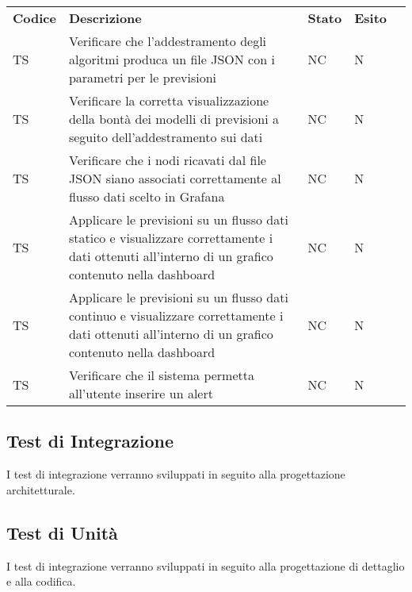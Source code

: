 \begin{longtable} {
		>{\centering}p{15mm} 
		>{\centering}p{79.5mm}
		>{\centering}p{15mm} 
		>{\centering}p{15mm}
		>{}p{0mm}}
	\rowcolor{gray!50}
	\textbf{Codice} & \textbf{Descrizione} & \textbf{Stato} & \textbf{Esito} &\TBstrut \\
	TS & Verificare che l'addestramento degli algoritmi produca un file JSON con i parametri per le previsioni & NC & N  &\TBstrut \\ [2mm]
	TS & Verificare la corretta visualizzazione della bontà dei modelli di previsioni a seguito dell'addestramento sui dati & NC & N  &\TBstrut \\ [2mm]
	TS & Verificare che i nodi ricavati dal file JSON siano associati correttamente al flusso dati scelto in Grafana\glo & NC & N  &\TBstrut \\ [2mm]
	TS & Applicare le previsioni su un flusso dati statico e visualizzare correttamente i dati ottenuti all'interno di un grafico contenuto nella dashboard\glo & NC & N  &\TBstrut \\ [2mm]
	TS & Applicare le previsioni su un flusso dati continuo e visualizzare correttamente i dati ottenuti all'interno di un grafico contenuto nella dashboard\glo & NC & N  &\TBstrut \\ [2mm]
	TS & Verificare che il sistema permetta all'utente inserire un alert\glo & NC & N  &\TBstrut \\ [2mm]
	
\end{longtable}


\subsection{Test di Integrazione}
I test di integrazione verranno sviluppati in seguito alla progettazione architetturale.

\subsection{Test di Unità}
I test di integrazione verranno sviluppati in seguito alla progettazione di dettaglio e alla codifica.
